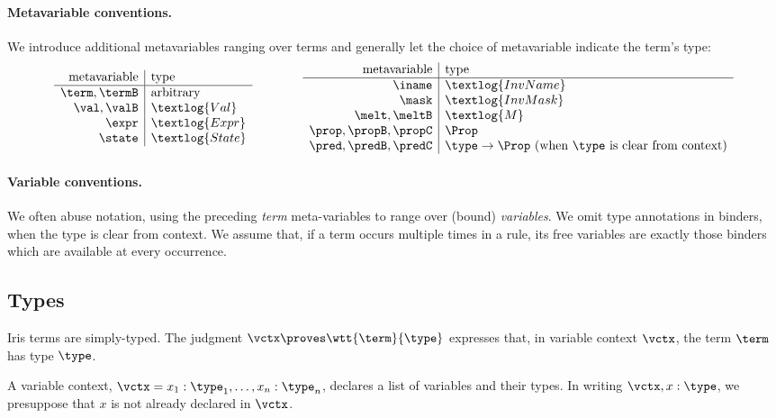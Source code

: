 \paragraph{Metavariable conventions.}
We introduce additional metavariables ranging over terms and generally let the choice of metavariable indicate the term's type:
\[
\begin{array}{r|l}
 \text{metavariable} & \text{type} \\\hline
  \term, \termB & \text{arbitrary} \\
  \val, \valB & \textlog{Val} \\
  \expr & \textlog{Expr} \\
  \state & \textlog{State} \\
\end{array}
\qquad\qquad
\begin{array}{r|l}
 \text{metavariable} & \text{type} \\\hline
  \iname & \textlog{InvName} \\
  \mask & \textlog{InvMask} \\
  \melt, \meltB & \textlog{M} \\
  \prop, \propB, \propC & \Prop \\
  \pred, \predB, \predC & \type\to\Prop \text{ (when $\type$ is clear from context)} \\
\end{array}
\]

\paragraph{Variable conventions.}
We often abuse notation, using the preceding \emph{term} meta-variables to range over (bound) \emph{variables}.
We omit type annotations in binders, when the type is clear from context.
We assume that, if a term occurs multiple times in a rule, its free variables are exactly those binders which are available at every occurrence.


\subsection{Types}\label{sec:types}

Iris terms are simply-typed.
The judgment $\vctx \proves \wtt{\term}{\type}$ expresses that, in variable context $\vctx$, the term $\term$ has type $\type$.

A variable context, $\vctx = x_1:\type_1, \dots, x_n:\type_n$, declares a list of variables and their types.
In writing $\vctx, x:\type$, we presuppose that $x$ is not already declared in $\vctx$.

